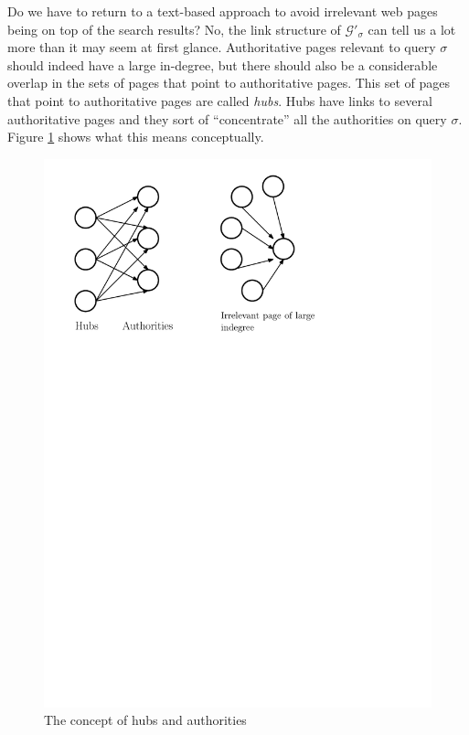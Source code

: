 \documentclass[a4paper,11pt]{report}
\newcommand{\graf}{\mathscr{G}}
\begin{document}
 Do we have to return to a text-based approach to avoid irrelevant web pages 
 being on top of the search results? No, the link structure of $\graf'_\sigma$ 
 can tell us a lot more than it may seem at first glance.  Authoritative pages 
 relevant to query $\sigma$ should indeed have a large in-degree, but there should also be a considerable overlap in the sets 
 of pages that point to authoritative pages. This set of pages that point to 
 authoritative pages are called \textit{hubs}. Hubs have links to several 
 authoritative pages and they sort of ``concentrate'' all the authorities on 
 query $\sigma$. Figure \ref{hubauth} shows what this means conceptually.
 \begin{figure}[h!]
  \centering
  \includegraphics[scale=1]{fig1hits.pdf}\caption{The concept of hubs and authorities}\label{hubauth}
\end{figure}
 
\end{document}
